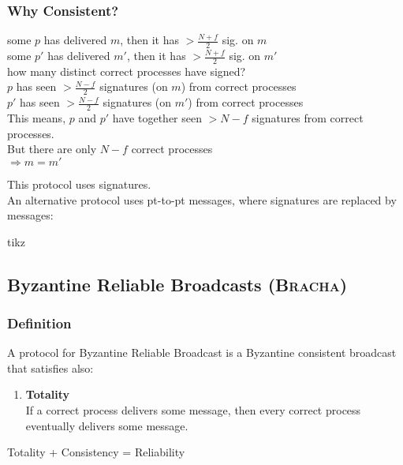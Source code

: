 \documentclass{article}
\begin{document}
\begin{adjustwidth}{2em}{2em}
\begin{adjustwidth}{2em}{2em}
			\subsubsection{Why Consistent?}
			\begin{adjustwidth}{2em}{}
				some $p$ has delivered $m$, then it has $> \frac{N+f}{2}$ sig. on $m$ \\
				some $p'$ has delivered $m'$, then it has $> \frac{N+f}{2}$ sig. on $m'$ \\
				how many distinct correct processes have signed? \\
				$p$ has seen $> \frac{N-f}{2}$ signatures (on $m$) from correct processes \\
				$p'$ has seen $> \frac{N-f}{2}$ signatures (on $m'$) from correct processes \\
				This means, $p$ and $p'$ have together seen $> N -f$ signatures from correct processes. \\
				But there are only $N-f$ correct processes \\
				$\Rightarrow m = m'$
			\end{adjustwidth}
			This protocol uses signatures. \\
			An alternative protocol uses pt-to-pt messages, where signatures are replaced by messages:
		\end{adjustwidth}
		\begin{center}
			tikz
		\end{center}
		\subsection{Byzantine Reliable Broadcasts (\textsc{Bracha})}
		\begin{adjustwidth}{2em}{2em}
			\subsubsection{Definition}
			\begin{adjustwidth}{2em}{}
				A protocol for Byzantine Reliable Broadcast is a Byzantine consistent broadcast that satisfies also:
				\begin{enumerate}[-]
					\item \textbf{Totality} \\
					If a correct process delivers some message, then every correct process eventually delivers some message.
				\end{enumerate}
				Totality + Consistency = Reliability
			\end{adjustwidth}

\end{adjustwidth}
\end{adjustwidth}
\end{document}
